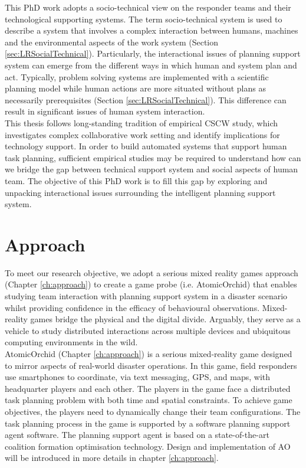 This PhD work adopts a socio-technical view on the responder teams and their technological supporting systems. The term socio-technical system is used to describe a system that involves a complex interaction between humans, machines and the environmental aspects of the work system (Section \ref{sec:LRSocialTechnical}). Particularly, the interactional issues of planning support system can emerge from the different ways in which human and system plan and act. Typically, problem solving systems are implemented with a scientific planning model while human actions are more situated without plans as necessarily prerequisites (Section \ref{sec:LRSocialTechnical}). This difference can result in significant issues of human system interaction.\\

This thesis follows long-standing tradition of empirical \ac{CSCW} study, which investigates complex collaborative work setting and identify implications for technology support. In order to build automated systems that support human task planning, sufficient empirical studies may be required to understand how can we bridge the gap between technical support system and social aspects of human team.  The objective of this PhD work is to fill this gap by exploring and unpacking interactional issues surrounding the intelligent planning support system.\\

\section{Approach}\label{sec:custom}


To meet our research objective, we adopt a serious mixed reality games approach (Chapter \ref{ch:approach}) to create a game probe (i.e. AtomicOrchid) that enables studying team interaction with planning support system in a disaster scenario whilst providing confidence in the efficacy of behavioural observations. Mixed-reality games bridge the physical and the digital divide. Arguably, they serve as a vehicle to study distributed interactions across multiple devices and ubiquitous computing environments in the wild.\\

AtomicOrchid (Chapter \ref{ch:approach}) is a serious mixed-reality game designed to mirror aspects of real-world disaster operations. In this game, field responders use smartphones to coordinate, via text messaging, GPS, and maps, with headquarter players and each other. The players in the game face a distributed task planning problem with both time and spatial constraints. To achieve game objectives, the players need to dynamically change their team configurations. The task planning process in the game is supported by a software planning support agent software. The planning support agent is based on a state-of-the-art coalition formation optimisation technology. Design and implementation of \acf{AO} will be introduced in more details in chapter \ref{ch:approach}.\\

